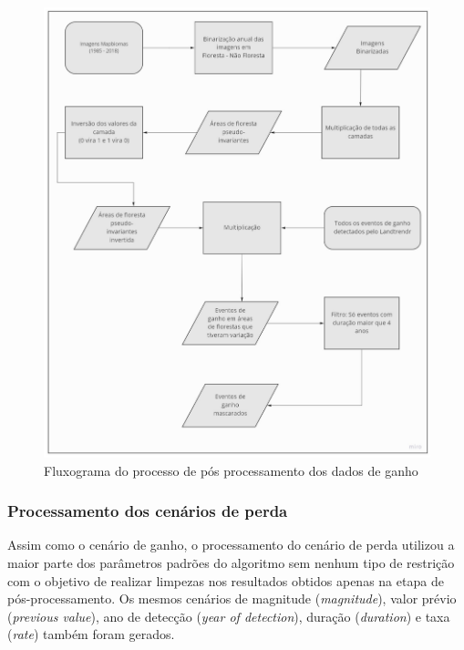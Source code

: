 \begin{figure}[H]
    \centering
    \includegraphics[scale=.4]{images/flow_ganho.pdf}
    \caption{Fluxograma do processo de pós processamento dos dados de ganho}
    \label{fig:flowchart_ganho}
\end{figure}


\subsubsection{Processamento dos cenários de perda}
\hspace{13pt} Assim como o cenário de ganho, o processamento do cenário de perda utilizou a maior parte dos parâmetros padrões do algoritmo sem nenhum tipo de restrição com o objetivo de realizar limpezas nos resultados obtidos apenas na etapa de pós-processamento. Os mesmos cenários de magnitude (\textit{magnitude}), valor prévio (\textit{previous value}), ano de detecção (\textit{year of detection}), duração (\textit{duration}) e taxa (\textit{rate}) também foram gerados.

